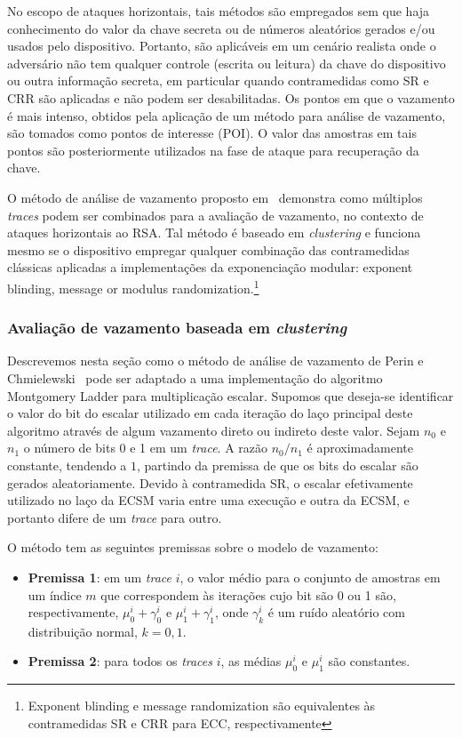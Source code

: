 \documentclass{SBCbookchapter}
\begin{document}
No escopo de ataques horizontais, tais métodos são empregados sem que haja conhecimento do valor da chave secreta ou de números aleatórios gerados e/ou usados pelo dispositivo. Portanto, são aplicáveis em um cenário realista onde o adversário não tem qualquer controle (escrita ou leitura) da chave do dispositivo ou outra informação secreta, em particular quando contramedidas como SR e CRR são aplicadas e não podem ser desabilitadas. Os pontos em que o vazamento é mais intenso, obtidos pela aplicação de um método para análise de vazamento, são tomados como pontos de interesse (POI). O valor das amostras em tais pontos são posteriormente utilizados na fase de ataque para recuperação da chave.

O método de análise de vazamento proposto em~\cite{PerinChmielewski2015} demonstra como múltiplos \emph{traces} podem ser combinados para a avaliação de vazamento, no contexto de ataques horizontais ao RSA. Tal método é baseado em \emph{clustering} e funciona mesmo se o dispositivo empregar qualquer combinação das contramedidas clássicas aplicadas a implementações da exponenciação modular: exponent blinding, message or modulus randomization.\footnote{Exponent blinding e message randomization são equivalentes às contramedidas SR e CRR para ECC, respectivamente}

\subsubsection{Avaliação de vazamento baseada em \emph{clustering}}

Descrevemos nesta seção como o método de análise de vazamento de Perin e Chmielewski~\cite{PerinChmielewski2015} pode ser adaptado a uma implementação do algoritmo Montgomery Ladder para multiplicação escalar. Supomos que deseja-se identificar o valor do bit do escalar utilizado em cada iteração do laço principal deste algoritmo através de algum vazamento direto ou indireto deste valor. Sejam $n_0$ e $n_1$ o número de bits 0 e 1 em um \emph{trace}. A razão $n_0/n_1$ é aproximadamente constante, tendendo a $1$, partindo da premissa de que os bits do escalar são gerados aleatoriamente. Devido à contramedida SR, o escalar efetivamente utilizado no laço da ECSM varia entre uma execução e outra da ECSM, e portanto difere de um \emph{trace} para outro.

O método tem as seguintes premissas sobre o modelo de vazamento:
\begin{itemize}
	\item \textbf{Premissa 1}: em um \emph{trace} $i$, o valor médio para o conjunto de amostras em um índice $m$ que correspondem às iterações cujo bit são 0 ou 1 são, respectivamente, $\mu_0^i + \gamma_0^i$ e $\mu_1^i + \gamma_1^i$, onde $\gamma_k^i$ é um ruído aleatório com distribuição normal, $k=0,1$.
	\item \textbf{Premissa 2}: para todos os \emph{traces} $i$, as médias $\mu_0^i$ e $\mu_1^i$ são constantes.
\end{itemize}
\end{document}
